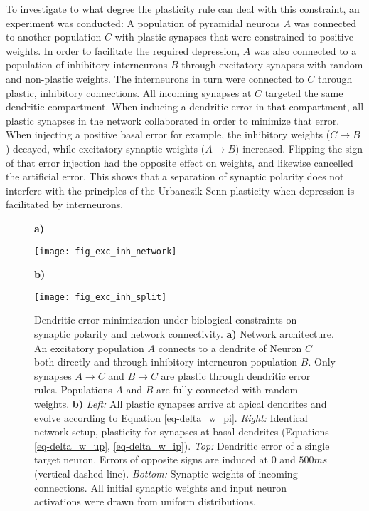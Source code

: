 To investigate to what degree the plasticity rule can deal with this constraint, an experiment was conducted: A
 population of pyramidal neurons $A$  was connected to another population $C$ with plastic synapses that were
 constrained to positive weights. In order to facilitate the required depression, $A$ was also connected to a population
 of inhibitory interneurons $B$ through excitatory synapses with random and non-plastic weights. The interneurons in
 turn were connected to $C$ through plastic, inhibitory connections. All incoming synapses at $C$ targeted the same
 dendritic compartment. When inducing a dendritic error in that compartment, all plastic synapses in the network
 collaborated in order to minimize that error. When injecting a positive basal error for example, the inhibitory weights
 ($C \rightarrow B$) decayed, while excitatory synaptic weights ($A \rightarrow B$) increased. Flipping the sign of that
 error injection had the opposite effect on weights, and likewise cancelled the artificial error. This shows that a
 separation of synaptic polarity does not interfere with the principles of the Urbanczik-Senn plasticity when depression
 is facilitated by interneurons.

 \begin{figure}[t]
    \centering
    \begin{minipage}{0.2\textwidth}
        \textbf{a)}\par\medskip
        \centering
        \texttt{[image: fig\_exc\_inh\_network]}
    \end{minipage}\hfill
    \begin{minipage}{0.7\textwidth}
        \textbf{b)}\par\medskip
        \centering
        \texttt{[image: fig\_exc\_inh\_split]}
    \end{minipage}
    \caption{Dendritic error minimization under biological constraints on synaptic polarity and network connectivity.
        \textbf{a)} Network architecture. An excitatory population $A$ connects to a dendrite of Neuron $C$ both
        directly and through inhibitory interneuron population $B$. Only synapses $A\rightarrow C$ and $B \rightarrow C$
        are plastic through dendritic error rules. Populations $A$ and $B$ are fully connected with random weights.
        \textbf{b)} \textit{Left:} All plastic synapses arrive at apical dendrites and evolve according to Equation
        \ref{eq-delta_w_pi}. \textit{Right:} Identical network setup, plasticity for synapses at basal dendrites
        (Equations \ref{eq-delta_w_up}, \ref{eq-delta_w_ip}). \textit{Top:} Dendritic error of a single target neuron.
        Errors of opposite signs are induced at $0$ and $500ms$ (vertical dashed line). \textit{Bottom:} Synaptic
        weights of incoming connections. All initial synaptic weights and input neuron activations were drawn from
        uniform distributions.}
    \label{fig-exc-inh-split}
\end{figure}

